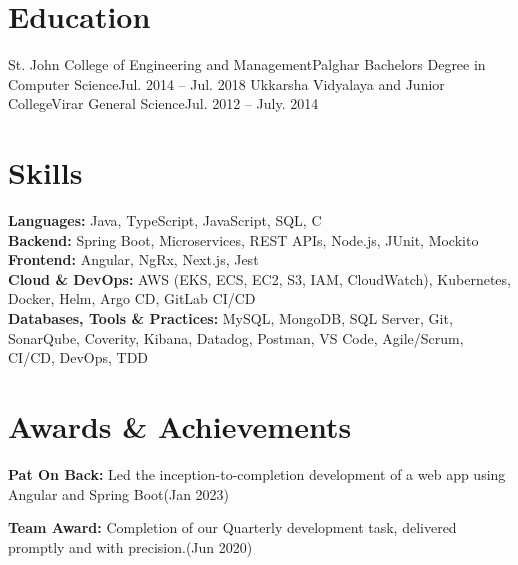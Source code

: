 \documentclass{resume}
\begin{document}
    
    \resumeItemListEnd
    
    \resumeSubHeadingListEnd

\section{Education}
  \resumeSubHeadingListStart
    \resumeSubheading
      {St. John College of Engineering and Management}{Palghar}
      {Bachelors Degree in Computer Science}{Jul. 2014 -- Jul. 2018}
    \resumeSubheading
      {Ukkarsha Vidyalaya and Junior College}{Virar}
      {General Science}{Jul. 2012 -- July. 2014}
  \resumeSubHeadingListEnd




\section{Skills}
\resumeSubHeadingListStart
\small{\item{
\textbf{Languages:} Java, TypeScript, JavaScript, SQL, C \\
\textbf{Backend:} Spring Boot, Microservices, REST APIs, Node.js, JUnit, Mockito \\
\textbf{Frontend:} Angular, NgRx, Next.js, Jest \\
\textbf{Cloud \& DevOps:} AWS (EKS, ECS, EC2, S3, IAM, CloudWatch), Kubernetes, Docker, Helm, Argo CD, GitLab CI/CD \\
\textbf{Databases, Tools \& Practices:} MySQL, MongoDB, SQL Server, Git, SonarQube, Coverity, Kibana, Datadog, Postman, VS Code, Agile/Scrum, CI/CD, DevOps, TDD
}}
\resumeSubHeadingListEnd



\section{Awards \& Achievements}
  \resumeSubHeadingListStart
    \small{\item{
        \textbf{Pat On Back:}{ Led the inception-to-completion development of a web app using Angular and Spring Boot(Jan 2023)} \\ \vspace{3pt}

        \textbf{Team Award:}{ Completion of our Quarterly development task, delivered promptly and with precision.(Jun 2020)} \\ \vspace{3pt}
        
    }}
  \resumeSubHeadingListEnd
\end{document}
